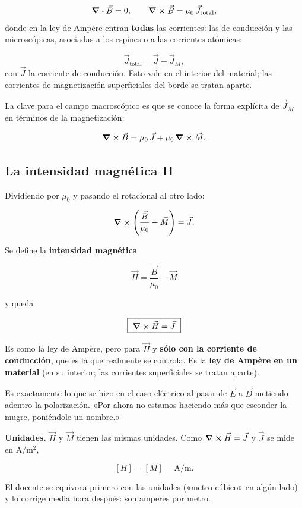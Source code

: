 \documentclass[12pt,a4paper]{article}
\begin{document}
\[
\div\vec B = 0, \qquad \curl\vec B = \mu_0\,\vec J_{\text{total}},
\]
donde en la ley de Ampère entran \textbf{todas} las corrientes: las de conducción y
las microscópicas, asociadas a los espines o a las corrientes atómicas:

\[
\vec J_{\text{total}} = \vec J + \vec J_M,
\]
con $\vec J$ la corriente de conducción. Esto vale en el interior del material;
las corrientes de magnetización superficiales del borde se tratan aparte.

La clave para el campo macroscópico es que se conoce la forma explícita de
$\vec J_M$ en términos de la magnetización:

\[
\curl\vec B = \mu_0\,\vec J + \mu_0\,\curl\vec M .
\]

\subsection{La intensidad magnética H}

Dividiendo por $\mu_0$ y pasando el rotacional al otro lado:

\[
\curl\left(\frac{\vec B}{\mu_0} - \vec M\right) = \vec J .
\]

Se define la \textbf{intensidad magnética}

\begin{keybox}
\[
\boxed{\ \vec H = \frac{\vec B}{\mu_0} - \vec M\ }
\]
\end{keybox}
y queda

\begin{keybox}
\[
\boxed{\ \curl\vec H = \vec J\ }
\]
\end{keybox}

Es como la ley de Ampère, pero para $\vec H$ y \textbf{sólo con la corriente de
conducción}, que es la que realmente se controla. Es la \textbf{ley de Ampère en un
material} (en su interior; las corrientes superficiales se tratan aparte).

Es exactamente lo que se hizo en el caso eléctrico al pasar de $\vec E$ a
$\vec D$ metiendo adentro la polarización. «Por ahora no estamos haciendo más
que esconder la mugre, poniéndole un nombre.»

\textbf{Unidades.} $\vec H$ y $\vec M$ tienen las mismas unidades. Como
$\curl\vec H = \vec J$ y $\vec J$ se mide en A/m$^2$,

\[
[H] = [M] = \text{A/m}.
\]

\begin{notebox}
El docente se equivoca primero con las unidades («metro cúbico» en algún
lado) y lo corrige media hora después: son amperes por metro.
\end{notebox}
\end{document}
